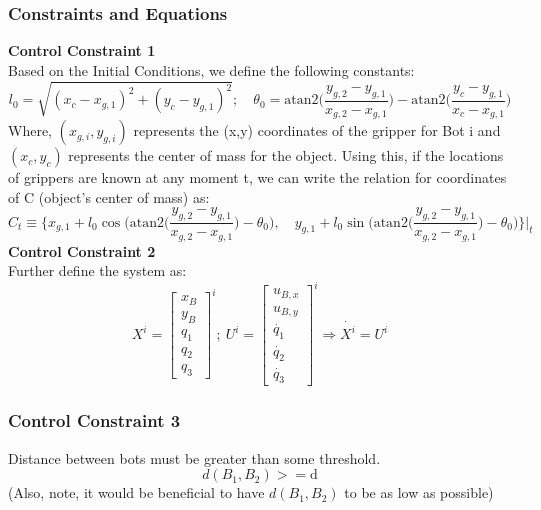 \documentclass[12pt,english]{report}
\begin{document}
\subsubsection*{Constraints and Equations}
\textbf{Control Constraint 1}\\
Based on the Initial Conditions, we define the following constants:
\[
l_0 = \sqrt{(x_c - x_{g,1})^2 + (y_c - y_{g,1})^2}; \quad \theta_0 = \text{atan2} \bigg(\frac{y_{g,2} - y_{g,1}}{x_{g,2} - x_{g,1}} \bigg)- \text{atan2} \bigg(\frac{y_c - y_{g,1}}{x_c- x_{g,1}}\bigg)
\]
Where, $(x_{g,i}, y_{g,i})$ represents the (x,y) coordinates of the gripper for Bot i and $(x_c, y_c)$ represents the center of mass for the object. Using this, if the locations of grippers are known at any moment t, we can write the relation for coordinates of C (object's center of mass) as: 
\begin{equation}
    C_t \equiv \bigg\{x_{g,1} + l_0\cos\bigg(\text{atan2} \bigg(\frac{y_{g,2} - y_{g,1}}{x_{g,2} - x_{g,1}}\bigg) -\theta_0 \bigg), \quad y_{g,1} + l_0\sin\bigg(\text{atan2} \bigg(\frac{y_{g,2} - y_{g,1}}{x_{g,2} - x_{g,1}}\bigg) -\theta_0 \bigg)\bigg\} \bigg \vert_{t}
\end{equation}
\textbf{Control Constraint 2}\\
Further define the system as: 
\begin{equation}
    X^i = 
    \begin{bmatrix}
        x_B\\
        y_B\\
        q_1\\
        q_2\\
        q_3
    \end{bmatrix}^i
    ; \ U^i = 
    \begin{bmatrix}
        u_{B,x}\\
        u_{B,y}\\
        \dot{q_1}\\
        \dot{q_2}\\
        \dot{q_3}
    \end{bmatrix}^i \Longrightarrow \dot{X^i}=U^i
\end{equation}
\subsubsection*{Control Constraint 3}
Distance between bots must be greater than some threshold.
\begin{equation}
    d(B_1, B_2) >= \text{d}
\end{equation}
(Also, note, it would be beneficial to have $d(B_1, B_2)$ to be as low as possible)
\end{document}
